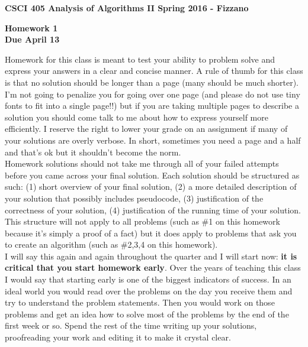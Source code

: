 \documentclass[11pt]{article}
\begin{document}
\textbf{CSCI 405 Analysis of Algorithms II \hfill Spring 2016 - Fizzano}

\begin{center}
\textbf{Homework 1 \\  Due April 13}
\end{center}

Homework for this class is meant to test your ability to problem solve and express your answers in a clear and concise manner.  A rule of thumb for this class is that no solution should be longer than a page (many should be much shorter).  I'm not going to penalize you for going over one page (and please do not use tiny fonts to fit into a single page!!) but if you are taking multiple pages to describe a solution you should come talk to me about how to express yourself more efficiently. I reserve the right to lower your grade on an assignment if many of your solutions are overly verbose. In short, sometimes you need a page and a half and that's ok but it shouldn't become the norm. \\

Homework solutions should not take me through all of your failed attempts before you came across your final solution. Each solution should be structured as such:  (1) short overview of your final solution, (2) a more detailed description of your solution that possibly includes pseudocode, (3) justification of the correctness of your solution, (4) justification of the running time of your solution.  This structure will not apply to all problems (such as \#1 on this homework because it's simply a proof of a fact) but it does apply to problems that ask you to create an algorithm (such as \#2,3,4 on this homework).  \\

I will say this again and again throughout the quarter and I will start now:  \textbf{it is critical that you start homework early}.  Over the years of teaching this class I would say that starting early is one of the biggest indicators of success.  In an ideal world you would read over the problems on the day you receive them and try to understand the problem statements.  Then you would work on those problems and get an idea how to solve most of the problems by the end of the first week or so.  Spend the rest of the time writing up your solutions, proofreading your work and editing it to make it crystal clear. \\
\end{document}
